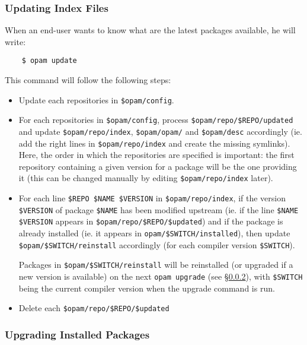 \documentclass[a4paper,11pt]{article}
\begin{document}
\subsubsection{Updating Index Files}
\label{opam-update}

When an end-user wants to know what are the latest packages available,
he will write:

\begin{verbatim}
    $ opam update
\end{verbatim}

This command will follow the following steps:

\begin{itemize}

\item Update each repositories in \verb+$opam/config+.

\item For each repositories in \verb+$opam/config+, process
  \verb+$opam/repo/$REPO/updated+ and update \verb+$opam/repo/index+,
  \verb+$opam/opam/+ and \verb+$opam/desc+ accordingly (ie. add the
  right lines in \verb+$opam/repo/index+ and create the missing
  symlinks). Here, the order in which the repositories are specified
  is important: the first repository containing a given version for a
  package will be the one providing it (this can be changed manually
  by editing \verb+$opam/repo/index+ later).

\item For each line \verb+$REPO $NAME $VERSION+ in
  \verb+$opam/repo/index+, if the version \verb+$VERSION+ of package
  \verb+$NAME+ has been modified upstream (ie. if the line
  \verb+$NAME $VERSION+ appears in \verb+$opam/repo/$REPO/$updated+)
  and if the package is already installed (ie. it appears in
  \verb+opam/$SWITCH/installed+), then update
  \verb+$opam/$SWITCH/reinstall+ accordingly (for each compiler
  version \verb+$SWITCH+).

  Packages in \verb+$opam/$SWITCH/reinstall+ will be reinstalled (or
  upgraded if a new version is available) on the next {\tt opam
    upgrade} (see \S\ref{opam-upgrade}), with \verb+$SWITCH+ being
  the current compiler version when the upgrade command is run.

\item Delete each \verb+$opam/repo/$REPO/$updated+

\end{itemize}

\subsubsection{Upgrading Installed Packages}
\label{opam-upgrade}
\end{document}
